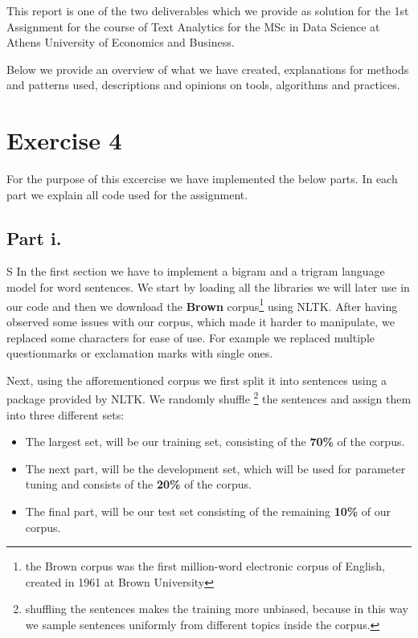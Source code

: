 \documentclass[11pt]{article}
\begin{document}
\maketitle

This report is one of the two deliverables which we provide as solution for the 1st Assignment for the course of Text Analytics for the MSc in Data Science at Athens University of Economics and Business. 

Below we provide an overview of what we have created, explanations for methods and patterns used, descriptions and opinions on tools, algorithms and practices.


\section*{Exercise 4}

For the purpose of this excercise we have implemented the below parts. In each part we explain all code used for the assignment.

\subsection*{Part i.}
S
In the first section we have to implement a bigram and a trigram language model for word sentences. 
We start by loading all the libraries we will later use in our code and then we download the \textbf{Brown} corpus\footnote{ the Brown corpus was the first million-word electronic corpus of English, created in 1961 at Brown University} using NLTK. After having observed some issues with our corpus, which made it harder to manipulate, we replaced some characters for ease of use. For example we replaced multiple questionmarks or exclamation marks with single ones. 

Next, using the afforementioned corpus we first split it into sentences using a package provided by NLTK. We randomly shuffle \footnote{shuffling the sentences makes the training more unbiased, because in this way we sample sentences uniformly from different topics inside the corpus.} the sentences and assign them into three different sets:
\begin{itemize}
\item
The largest set, will be our training set, consisting of the \textbf{70\%} of the corpus. 
\item The next part, will be the development set, which will be used for parameter tuning and consists of the \textbf{20\%} of the corpus. 
\item The final part, will be our test set consisting of the remaining \textbf{10\%} of our corpus.
\end{itemize}
\end{document}
